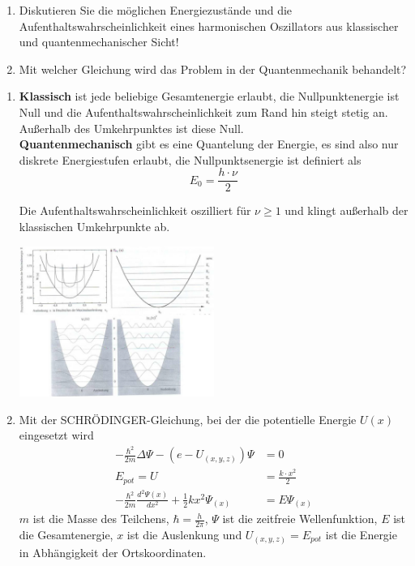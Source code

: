 \documentclass[12pt,a4paper,ngerman]{article}
\begin{document}
\pagebreak


\begin{framed}
\begin{enumerate}
\item Diskutieren Sie die möglichen Energiezustände und die Aufenthaltswahrscheinlichkeit eines harmonischen Oszillators aus klassischer und quantenmechanischer Sicht!
\item Mit welcher Gleichung wird das Problem in der Quantenmechanik behandelt?
\end{enumerate}
\end{framed}

\begin{enumerate}
\item \textbf{Klassisch} ist jede beliebige Gesamtenergie erlaubt, die Nullpunktenergie ist Null und die Aufenthaltswahrscheinlichkeit zum Rand hin steigt stetig an. Außerhalb des Umkehrpunktes ist diese Null. \\
\textbf{Quantenmechanisch} gibt es eine Quantelung der Energie, es sind also nur diskrete Energiestufen erlaubt, die Nullpunktsenergie ist definiert als
\begin{equation*}
E_0 = \frac{h\cdot \nu}{2}
\end{equation*}

Die Aufenthaltswahrscheinlichkeit oszilliert für $\nu \geq 1$ und klingt außerhalb der klassischen Umkehrpunkte ab. 

\begin{center}
\includegraphics[width=0.5\textwidth]{oszillator.png} 
\end{center}

\item Mit der SCHRÖDINGER-Gleichung, bei der die potentielle Energie $U(x)$ eingesetzt wird
\begin{align*}
-\frac{\hbar^2}{2m} \Delta \Psi - (e-U_{(x,y,z)})\Psi &= 0 \\
E_{pot} = U  &= \frac{k \cdot x^2}{2} \\
-\frac{\hbar^2}{2m}\frac{d^2\Psi(x)}{dx^2} + \frac{1}{2}kx^2\Psi_{(x)} &= E\Psi_{(x)}
\end{align*}
$m$ ist die Masse des Teilchens, $\hbar = \frac{h}{2\pi}$, $\Psi$ ist die zeitfreie Wellenfunktion, $E$ ist die Gesamtenergie, $x$ ist die Auslenkung und $U_{(x,y,z)} = E_{pot}$ ist die Energie in Abhängigkeit der Ortskoordinaten. 
\end{enumerate}
\end{document}
